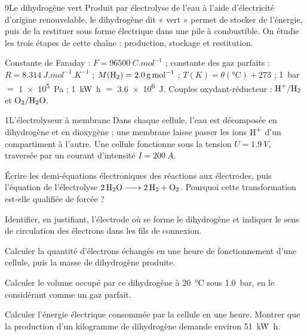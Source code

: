 

\begin{exoBac}{9}{Le dihydrogène vert}
Produit par électrolyse de l'eau à l'aide d'électricité d'origine renouvelable, le dihydrogène dit « vert » permet de
stocker de l'énergie, puis de la restituer sous forme électrique dans une pile à combustible. On étudie les trois
étapes de cette chaîne : production, stockage et restitution.
\begin{donnees}
Constante de Faraday : $F=\qty{96500}{C.mol^{-1}}$ ; constante des gaz parfaits : $R=\qty{8,314}{J.mol^{-1}.K^{-1}}$ ;
$M(\ce{H2})=\qty{2,0}{g.mol^{-1}}$ ; $T(\unit{K})=\theta(\unit{\degreeCelsius})+273$ ; \qty{1}{bar} $=$ \qty{1e5}{Pa} ; \qty{1}{kW.h} $=$ \qty{3,6e6}{J}.
Couples oxydant-réducteur : $\ce{H+}/\ce{H2}$ et $\ce{O2}/\ce{H2O}$.
\end{donnees}

\begin{docu}{1}{L'électrolyseur à membrane}
Dans chaque cellule, l'eau est décomposée en dihydrogène et en dioxygène ; une membrane laisse passer les ions
$\ce{H+}$ d'un compartiment à l'autre. Une cellule fonctionne sous la tension $U=\qty{1,9}{V}$, traversée par un courant
d'intensité $I=\qty{200}{A}$.
\end{docu}
\begin{questions}
\item Écrire les demi-équations électroniques des réactions aux électrodes, puis l'équation de l'électrolyse
$\ce{2H2O -> 2H2 + O2}$. Pourquoi cette transformation est-elle qualifiée de forcée ?
\item Identifier, en justifiant, l'électrode où se forme le dihydrogène et indiquer le sens de circulation des électrons
dans les fils de connexion.
\item Calculer la quantité d'électrons échangés en une heure de fonctionnement d'une cellule, puis la masse de
dihydrogène produite.
\item Calculer le volume occupé par ce dihydrogène à \qty{20}{\degreeCelsius} sous \qty{1,0}{bar}, en le considérant comme un gaz parfait.
\item Calculer l'énergie électrique consommée par la cellule en une heure. Montrer que la production d'un kilogramme
de dihydrogène demande environ \qty{51}{kW.h}.
\end{questions}


\end{exoBac}
